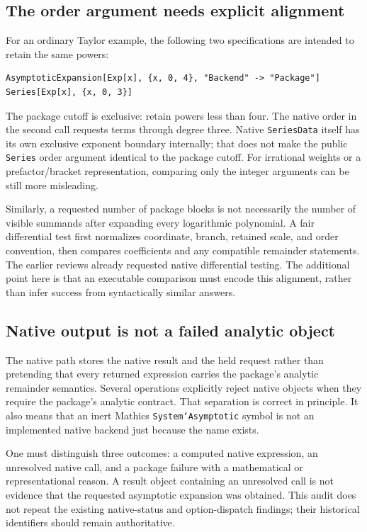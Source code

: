 \documentclass[11pt,letterpaper]{article}
\newcommand{\code}[1]{\texttt{#1}}
\begin{document}
\subsection{The order argument needs explicit alignment}

For an ordinary Taylor example, the following two specifications are intended to retain the same powers:
\begin{lstlisting}
AsymptoticExpansion[Exp[x], {x, 0, 4}, "Backend" -> "Package"]
Series[Exp[x], {x, 0, 3}]
\end{lstlisting}
The package cutoff is exclusive: retain powers less than four. The native order in the second call requests terms through degree three. Native \code{SeriesData} itself has its own exclusive exponent boundary internally; that does not make the public \code{Series} order argument identical to the package cutoff. For irrational weights or a prefactor/bracket representation, comparing only the integer arguments can be still more misleading.~\cite{core,wl-series,wl-data}

Similarly, a requested number of package blocks is not necessarily the number of visible summands after expanding every logarithmic polynomial. A fair differential test first normalizes coordinate, branch, retained scale, and order convention, then compares coefficients and any compatible remainder statements. The earlier reviews already requested native differential testing. The additional point here is that an executable comparison must encode this alignment, rather than infer success from syntactically similar answers.

\subsection{Native output is not a failed analytic object}

The native path stores the native result and the held request rather than pretending that every returned expression carries the package's analytic remainder semantics. Several operations explicitly reject native objects when they require the package's analytic contract. That separation is correct in principle. It also means that an inert Mathics \code{System`Asymptotic} symbol is not an implemented native backend just because the name exists.~\cite{native,compat}

One must distinguish three outcomes: a computed native expression, an unresolved native call, and a package failure with a mathematical or representational reason. A result object containing an unresolved call is not evidence that the requested asymptotic expansion was obtained. This audit does not repeat the existing native-status and option-dispatch findings; their historical identifiers should remain authoritative.~\cite{register,intake}
\end{document}
